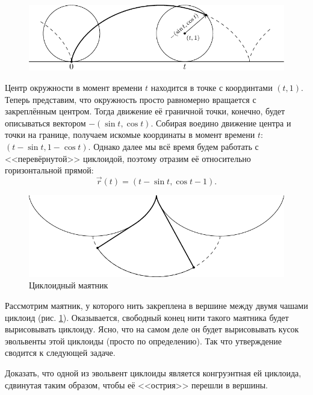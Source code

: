 \begin{figure}[H]
	\centering
	\includegraphics[width=12cm]{./img/CycloidEquation.pdf}
	\caption[format=empty]{}
\end{figure}

Центр окружности в момент времени $t$ находится в точке с координтами $(t, 1)$. Теперь представим, что окружность просто равномерно вращается с закреплённым центром. Тогда движение её граничной точки, конечно, будет описываться вектором $-(\sin t, \cos t)$. Собирая воедино движение центра и точки на границе, получаем искомые координаты в момент времени $t$: $(t - \sin t, 1 - \cos t)$. Однако далее мы всё время будем работать с <<перевёрнутой>> циклоидой, поэтому отразим её относительно горизонтальной прямой:
\[
	\vec{r}(t) = (t - \sin t, \cos t - 1).
\]

\begin{figure}[H]
	\centering
	\includegraphics[width=12cm]{./img/Pendulum.pdf}
	\caption{Циклоидный маятник}
	\label{fig:Pendulum}
\end{figure}

Рассмотрим маятник, у которого нить закреплена в вершине между двумя чашами циклоид (рис. \ref{fig:Pendulum}). Оказывается, свободный конец нити такого маятника будет вырисовывать циклоиду. Ясно, что на самом деле он будет вырисовывать кусок эвольвенты этой циклоиды (просто по определению). Так что утверждение сводится к следующей задаче.

\begin{problem}
	Доказать, что одной из эвольвент циклоиды является конгруэнтная ей циклоида, сдвинутая таким образом, чтобы её <<острия>> перешли в вершины.
\end{problem}

